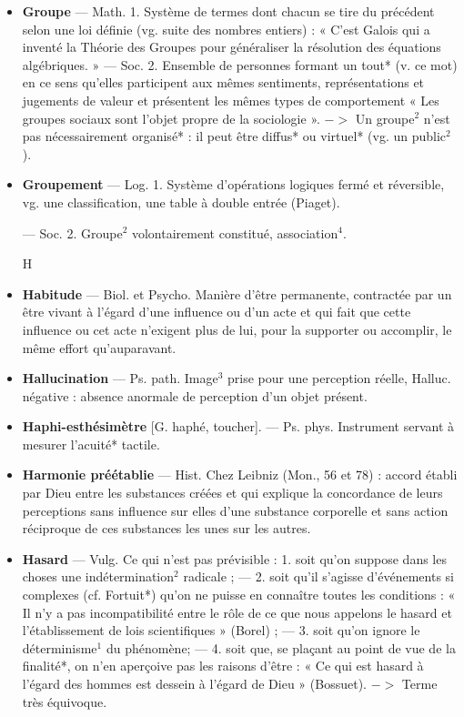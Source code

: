 \begin{itemize}[leftmargin=1cm, label=, itemsep=1pt]
\item {\bf Groupe} — Math. 1. Système de termes
dont chacun se tire du précédent
selon une loi définie (vg. suite des
nombres entiers) : « C’est Galois qui
a inventé la Théorie des Groupes
pour généraliser la résolution des
équations algébriques. » — Soc.
2. Ensemble de personnes formant
un tout* (v. ce mot) en ce sens
qu’elles participent aux mêmes sentiments, représentations et jugements de valeur et présentent les
mêmes types de comportement
« Les groupes sociaux sont l’objet
propre de la sociologie ». $->$ Un
groupe$^2$ n'est pas nécessairement
organisé* : il peut être diffus* ou
virtuel* (vg. un public$^2$).

\item {\bf Groupement} — Log. 1. Système d'opérations logiques fermé et réversible,
vg. une classification, une table à
double entrée (Piaget).

— Soc. 2. Groupe$^2$
volontairement constitué, association$^4$.

\begin{center}
H
\end{center}

\item {\bf Habitude} — Biol. et Psycho. Manière
d’être permanente, contractée par
un être vivant à l'égard d’une influence ou d’un acte et qui fait que
cette influence ou cet acte n’exigent
plus de lui, pour la supporter ou
accomplir, le même effort qu’auparavant.

\item {\bf Hallucination} — Ps. path. Image$^3$
prise pour une perception réelle,
Halluc. négative : absence anormale
de perception d’un objet présent.

\item {\bf Haphi-esthésimètre} [G. haphé, toucher]. — Ps. phys. Instrument servant à mesurer l’acuité* tactile.

\item {\bf Harmonie préétablie} — Hist. Chez
Leibniz (Mon., 56 et 78) : accord
établi par Dieu entre les substances
créées et qui explique la concordance
de leurs perceptions sans influence
sur elles d’une substance corporelle
et sans action réciproque de ces
substances les unes sur les autres.

\item {\bf Hasard} — Vulg. Ce qui n’est pas
prévisible : 1. soit qu’on suppose
dans les choses une indétermination$^2$
radicale ; — 2. soit qu'il s'agisse
d'événements si complexes (cf. Fortuit*) qu’on ne puisse en connaître
toutes les conditions : « Il n’y a pas
incompatibilité entre le rôle de ce
que nous appelons le hasard et l’établissement de lois scientifiques »
(Borel) ; — 3. soit qu’on ignore le
déterminisme$^1$ du phénomène; —
4. soit que, se plaçant au point de
vue de la finalité*, on n’en aperçoive
pas les raisons d’être : « Ce
qui est hasard à l’égard des hommes
est dessein à l'égard de Dieu » (Bossuet). $->$ Terme très équivoque.


\end{itemize}
